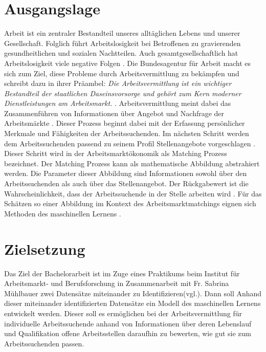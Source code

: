 \documentclass[
    11pt,
    a4paper,
    egregdoesnotlikesansseriftitles,
    toc=chapterentrywithdots,
    oneside,openright,
    titlepage,
    parskip=half,
    headings=normal,  %
    listof=totoc,
    bibliography=totoc,
    index=totoc,
    captions=tableheading,  %
    chapterprefix,
    listof=flat,
    final
]{scrbook}
\begin{document}
\setcounter{secnumdepth}{3}  %
\setcounter{tocdepth}{2}  %

\frontmatter
{} 




\tableofcontents


{\let\clearpage\relax \chapter{Ausgangslage}}
Arbeit ist ein zentraler Bestandteil unseres alltäglichen Lebens und unserer Gesellschaft. Folglich führt Arbeitslosigkeit bei Betroffenen zu gravierenden gesundheitlichen und sozialen Nachtteilen. Auch gesamtgesellschaftlich hat Arbeitslosigkeit viele negative Folgen \cite{Bpb}. 
Die Bundesagentur für Arbeit macht es sich zum Ziel, diese Probleme durch Arbeitsvermittlung zu bekämpfen \cite{BasVors} und schreibt dazu in ihrer Präambel:
\textit{Die Arbeitsvermittlung ist ein wichtiger Bestandteil der staatlichen Daseinsvorsorge und gehört zum Kern moderner Dienstleistungen am Arbeitsmarkt.} 
\cite{Bas}. Arbeitsvermittlung meint dabei das Zusammenführen von Informationen über Angebot und Nachfrage der Arbeitsmärkte \cite{Bpbarbeit}.
\newline
Dieser Prozess beginnt dabei mit der Erfassung persönlicher Merkmale und Fähigkeiten der Arbeitssuchenden. Im nächsten Schritt werden dem Arbeitssuchenden passend zu seinem Profil Stellenangebote vorgeschlagen \cite{Bas}. Dieser Schritt wird in der Arbeitsmarktökonomik als Matching Prozess bezeichnet. Der Matching Prozess kann als mathematische Abbildung abstrahiert werden. Die Parameter dieser Abbildung sind Informationen sowohl über den Arbeitssuchenden als auch über das Stellenangebot. Der Rückgabewert ist die Wahrscheinlichkeit, dass der Arbeitssuchende in der Stelle arbeiten wird \cite{grandstrand}.
Für das Schätzen so einer Abbildung im Kontext des Arbeitsmarktmatchings eignen sich Methoden des maschinellen Lernens \cite{mül}.

{\let\clearpage\relax \chapter{Zielsetzung}}
Das Ziel der Bachelorarbeit ist im Zuge eines Praktikums beim Institut für Arbeitsmarkt- und Berufsforschung in Zusammenarbeit mit Fr. Sabrina Mühlbauer zwei Datensätze miteinander zu Identifizieren(vgl.). Dann soll Anhand dieser miteinander identifizierten Datensätze ein Modell des maschinellen Lernens entwickelt werden. Dieser soll es ermöglichen bei der Arbeitsvermittlung für individuelle Arbeitssuchende anhand von Informationen über deren Lebenslauf und Qualifikation offene Arbeitsstellen daraufhin zu bewerten, wie gut sie zum Arbeitssuchenden passen. 
\end{document}
